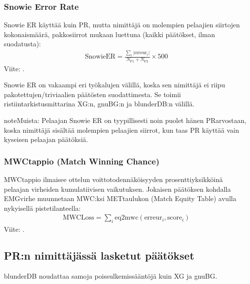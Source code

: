 \documentclass[letterpaper,10pt,finnish]{sphinxmanual}
\begin{document}
\subsubsection{Snowie Error Rate}
\label{\detokenize{stats_parity:snowie-error-rate}}
\sphinxAtStartPar
Snowie ER käyttää  kuin PR, mutta nimittäjä on molempien pelaajien siirtojen kokonaismäärä, pakkosiirrot mukaan luettuna (kaikki päätökset, ilman suodatusta):
\begin{equation*}
\begin{split}\mathrm{SnowieER} = \frac{\sum_i |\mathrm{erreur}_i|}{N_\text{P1} + N_\text{P2}} \times 500\end{split}
\end{equation*}
\sphinxAtStartPar
Viite: .

\sphinxAtStartPar
Snowie ER on vakaampi eri työkalujen välillä, koska sen nimittäjä ei riipu pakotettujen/triviaalien päätösten suodattimesta. Se toimii ristiintarkistusmittarina XG:n, gnuBG:n ja blunderDB:n välillä.

\begin{sphinxadmonition}{note}{Muista:}
\sphinxAtStartPar
Pelaajan Snowie ER on tyypillisesti noin puolet hänen PR\sphinxhyphen{}arvostaan, koska nimittäjä sisältää molempien pelaajien siirrot, kun taas PR käyttää vain kyseisen pelaajan päätöksiä.
\end{sphinxadmonition}


\subsubsection{MWC\sphinxhyphen{}tappio (Match Winning Chance)}
\label{\detokenize{stats_parity:perte-mwc-match-winning-chance}}
\sphinxAtStartPar
MWC\sphinxhyphen{}tappio ilmaisee ottelun voittotodennäköisyyden prosenttiyksikköinä pelaajan virheiden kumulatiivisen vaikutuksen. Jokaisen päätöksen kohdalla EMG\sphinxhyphen{}virhe muunnetaan MWC:ksi MET\sphinxhyphen{}taulukon (Match Equity Table) avulla nykyisellä pistetilanteella:
\begin{equation*}
\begin{split}\mathrm{MWCLoss} = \sum_i \mathrm{eq2mwc}(\mathrm{erreur}_i, \mathrm{score}_i)\end{split}
\end{equation*}
\sphinxAtStartPar
Viite: .


\subsection{PR:n nimittäjässä lasketut päätökset}
\label{\detokenize{stats_parity:decisions-comptees-au-denominateur-du-pr}}
\sphinxAtStartPar
blunderDB noudattaa samoja poissulkemissääntöjä kuin XG ja gnuBG.
\end{document}
